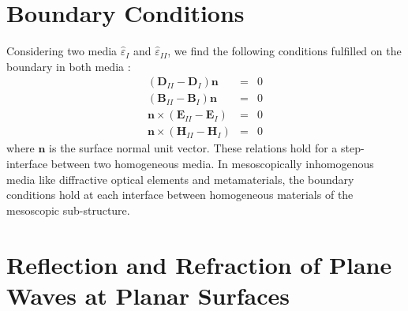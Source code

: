 \documentclass[12pt,a4paper,twoside,openright,BCOR10mm,headsepline,titlepage,abstracton,chapterprefix,final]{scrreprt}
\newcommand\Vector[1]{{\mathbf{#1}}}
\newcommand\Tensor[1]{\hat{#1}}
\newcommand\scalarEfield{E}
\newcommand\scalarBfield{B}
\newcommand\scalarHfield{H}
\newcommand\scalarDfield{D}
\newcommand\Efield{\Vector{\scalarEfield}}
\newcommand\Bfield{\Vector{\scalarBfield}}
\newcommand\Hfield{\Vector{\scalarHfield}}
\newcommand\Dfield{\Vector{\scalarDfield}}
\newcommand\permittivity{\Tensor{\scalarpermittivity}}
\newcommand\scalarpermittivity{\varepsilon}
\newcommand\materialone{I}
\newcommand\materialtwo{{II}}
\begin{document}
\section{Boundary Conditions}
Considering two media $\permittivity_\materialone$ and $\permittivity_\materialtwo$, we find the following conditions fulfilled on the boundary in both media \cite{Jackson}:
\begin{subequations}
\begin{eqnarray}
 ( \Dfield_\materialtwo - \Dfield_\materialone ) \Vector{n} &=& 0 \\
 ( \Bfield_\materialtwo - \Bfield_\materialone ) \Vector{n} &=& 0 \\
 \Vector{n} \times ( \Efield_\materialtwo - \Efield_\materialone ) &=& 0 \\
 \Vector{n} \times ( \Hfield_\materialtwo - \Hfield_\materialone ) &=& 0 
\end{eqnarray}
\label{eq:boundary_conditions} 
\end{subequations}
where $\Vector{n}$ is the surface normal unit vector.
These relations hold for a step-interface between two homogeneous media. 
In mesoscopically inhomogenous media like  diffractive optical elements and metamaterials, 
the boundary conditions hold at each interface between homogeneous materials of the mesoscopic sub-structure.


\section{Reflection and Refraction of Plane Waves at Planar Surfaces}
\end{document}
